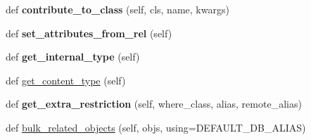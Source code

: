 \begin{DoxyCompactItemize}
\item 
\mbox{\label{classdjango_1_1contrib_1_1contenttypes_1_1fields_1_1_generic_relation_a46f6ee0f9c7ee1a2ac0223a55365aa98}} 
def {\bfseries contribute\+\_\+to\+\_\+class} (self, cls, name, kwargs)
\item 
\mbox{\label{classdjango_1_1contrib_1_1contenttypes_1_1fields_1_1_generic_relation_af80885b22d679ec0dbaee9f775196eef}} 
def {\bfseries set\+\_\+attributes\+\_\+from\+\_\+rel} (self)
\item 
\mbox{\label{classdjango_1_1contrib_1_1contenttypes_1_1fields_1_1_generic_relation_a7990bd2f6bb83da4e41a86482aeb7960}} 
def {\bfseries get\+\_\+internal\+\_\+type} (self)
\item 
def \mbox{\hyperlink{classdjango_1_1contrib_1_1contenttypes_1_1fields_1_1_generic_relation_a276f967389fb312408beb15ddd5d45ac}{get\+\_\+content\+\_\+type}} (self)
\item 
\mbox{\label{classdjango_1_1contrib_1_1contenttypes_1_1fields_1_1_generic_relation_a740a3462a542ad956480b4ed73c92636}} 
def {\bfseries get\+\_\+extra\+\_\+restriction} (self, where\+\_\+class, alias, remote\+\_\+alias)
\item 
def \mbox{\hyperlink{classdjango_1_1contrib_1_1contenttypes_1_1fields_1_1_generic_relation_a90c1e1dff24c340309efe119c442631e}{bulk\+\_\+related\+\_\+objects}} (self, objs, using=D\+E\+F\+A\+U\+L\+T\+\_\+\+D\+B\+\_\+\+A\+L\+I\+AS)
\end{DoxyCompactItemize}
